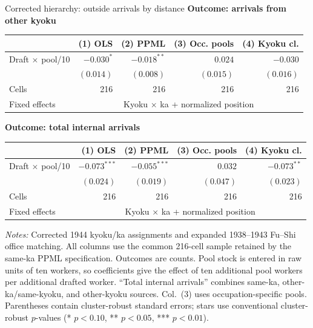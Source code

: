 \documentclass{beamer}
\begin{document}
\begin{frame}[t]{Corrected hierarchy: outside arrivals by distance}
\centering\tiny\vspace{-0.5em}
\textbf{Outcome: arrivals from other kyoku}\\[-1pt]
\begin{tabular}{lrrrr}\toprule
 & (1) OLS & (2) PPML & (3) Occ. pools & (4) Kyoku cl. \\\midrule
Draft $\times$ pool/10 & $-0.030^{*}$ & $-0.018^{**}$ & $0.024$ & $-0.030$ \\
 & $(0.014)$ & $(0.008)$ & $(0.015)$ & $(0.016)$ \\
Cells & 216 & 216 & 216 & 216 \\
Fixed effects & \multicolumn{4}{c}{Kyoku $\times$ ka + normalized position} \\\bottomrule\end{tabular}
\smallskip
\textbf{Outcome: total internal arrivals}\\[-1pt]
\begin{tabular}{lrrrr}\toprule
 & (1) OLS & (2) PPML & (3) Occ. pools & (4) Kyoku cl. \\\midrule
Draft $\times$ pool/10 & $-0.073^{***}$ & $-0.055^{***}$ & $0.032$ & $-0.073^{**}$ \\
 & $(0.024)$ & $(0.019)$ & $(0.047)$ & $(0.023)$ \\
Cells & 216 & 216 & 216 & 216 \\
Fixed effects & \multicolumn{4}{c}{Kyoku $\times$ ka + normalized position} \\\bottomrule\end{tabular}
\vspace{0.4em}\raggedright
{\tiny \textit{Notes:} Corrected 1944 kyoku/ka assignments and expanded 1938--1943 Fu--Shi office matching. All columns use the common 216-cell sample retained by the same-ka PPML specification. Outcomes are counts. Pool stock is entered in raw units of ten workers, so coefficients give the effect of ten additional pool workers per additional drafted worker. ``Total internal arrivals'' combines same-ka, other-ka/same-kyoku, and other-kyoku sources. Col.\ (3) uses occupation-specific pools. Parentheses contain cluster-robust standard errors; stars use conventional cluster-robust $p$-values (* $p<0.10$, ** $p<0.05$, *** $p<0.01$).}
\end{frame}
\end{document}
